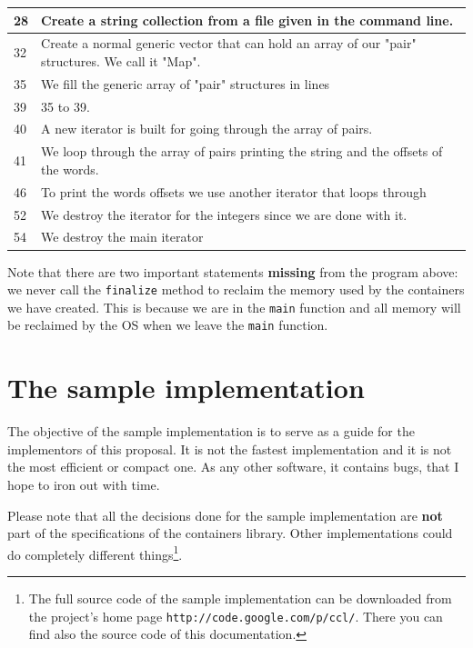 \documentclass[12pt,a4paper]{memoir} %
\begin{document}
{{{\begin{longtable}{|p{1.0cm}|p{13.5cm}|}
28& Create a string collection from a file given in the
   command line.\\\hline
32& Create a normal generic vector that can hold an array
   of our "pair" structures. We call it "Map".\\\hline
35& We fill the generic array of "pair" structures in lines\\
39& 35 to 39.\\\hline
40& A new iterator is built for going through the array of
   pairs.\\\hline
41& We loop through the array of pairs printing the string and
   the offsets of the words.\\\hline
46& To print the words offsets we use another iterator that
   loops through\\\hline
52& We destroy the iterator for the integers since we are done
   with it.\\\hline
54& We destroy the main iterator \\\hline
\end{longtable}
}

Note that there are two important statements \textbf{missing} from the program above: we never call the \texttt{finalize} method to reclaim the memory used by the containers we have created. This is because we are in the \texttt{main} function and all memory will be reclaimed by the OS when we leave the \texttt{main} function.
\chapter{The sample implementation}
The objective of the sample implementation is to serve as a guide for the implementors of this proposal. It is not the fastest implementation and it is not the most efficient or compact one. As any other software, it contains bugs, that I hope to iron out with time.

Please note that all the decisions done for the sample implementation are \textbf{not} part of the specifications of the containers library. Other
implementations could do completely different things\footnote{The full source code of the sample implementation can be downloaded from
the project's home page  \Verb,http://code.google.com/p/ccl/,. There you can find also the source code of this documentation. }.
}}
\end{document}
